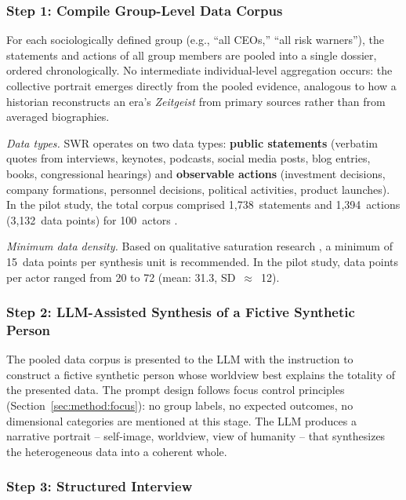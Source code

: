 \documentclass[11pt,a4paper]{article}
\begin{document}
\subsubsection{Step 1: Compile Group-Level Data Corpus}

For each sociologically defined group (e.g., ``all CEOs,'' ``all risk warners''), the statements and actions of all group members are pooled into a single dossier, ordered chronologically. No intermediate individual-level aggregation occurs: the collective portrait emerges directly from the pooled evidence, analogous to how a historian reconstructs an era's \emph{Zeitgeist} from primary sources rather than from averaged biographies.

\emph{Data types.} SWR operates on two data types: \textbf{public statements} (verbatim quotes from interviews, keynotes, podcasts, social media posts, blog entries, books, congressional hearings) and \textbf{observable actions} (investment decisions, company formations, personnel decisions, political activities, product launches). In the pilot study, the total corpus comprised 1,738~statements and 1,394~actions (3,132~data points) for 100~actors \citep{Geiger2026PaperA}.

\emph{Minimum data density.} Based on qualitative saturation research \citep{Guest2006, FugardPotts2015}, a minimum of 15~data points per synthesis unit is recommended. In the pilot study, data points per actor ranged from 20 to 72 (mean: 31.3, SD~$\approx$~12).

\subsubsection{Step 2: LLM-Assisted Synthesis of a Fictive Synthetic Person}

The pooled data corpus is presented to the LLM with the instruction to construct a fictive synthetic person whose worldview best explains the totality of the presented data. The prompt design follows focus control principles (Section~\ref{sec:method:focus}): no group labels, no expected outcomes, no dimensional categories are mentioned at this stage. The LLM produces a narrative portrait -- self-image, worldview, view of humanity -- that synthesizes the heterogeneous data into a coherent whole.

\subsubsection{Step 3: Structured Interview}
\end{document}
